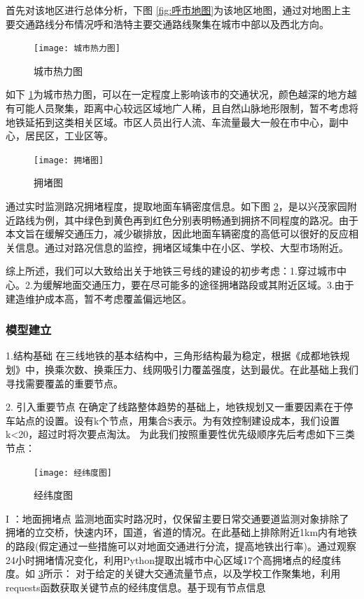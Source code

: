 \documentclass[12pt,a4paper]{mcmthesis}
\begin{document}
    首先对该地区进行总体分析，下图 \ref{fig:呼市地图}为该地区地图，通过对地图上主要交通路线分布情况呼和浩特主要交通路线聚集在城市中部以及西北方向。

    \begin{figure}[h!t]
        \centerline{\texttt{[image: 城市热力图]}\quad
        }
        \caption{\song\wuhao
        城市热力图}
        \label{fig:城市热力图}
    \end{figure}
    如下 \ref{fig:城市热力图}为城市热力图，可以在一定程度上影响该市的交通状况，颜色越深的地方越有可能人员聚集，距离中心较远区域地广人稀，且自然山脉地形限制，暂不考虑将地铁延拓到这类相关区域。市区人员出行人流、车流量最大一般在市中心，副中心，居民区，工业区等。
    \begin{figure}[h!t]
        \centerline{\texttt{[image: 拥堵图]}\quad
        }
        \caption{\song\wuhao
        拥堵图}
        \label{fig:拥堵图}
    \end{figure}


    通过实时监测路况拥堵程度，提取地面车辆密度信息。如下图 \ref{fig:拥堵图}，是以兴茂家园附近路线为例，其中绿色到黄色再到红色分别表明畅通到拥挤不同程度的路况。由于本文旨在缓解交通压力，减少碳排放，因此地面车辆密度的高低可以很好的反应相关信息。通过对路况信息的监控，拥堵区域集中在小区、学校、大型市场附近。

    综上所述，我们可以大致给出关于地铁三号线的建设的初步考虑：1.穿过城市中心。2.为缓解地面交通压力，要在尽可能多的途径拥堵路段或其附近区域。3.由于建造维护成本高，暂不考虑覆盖偏远地区。

    \subsubsection{模型建立}
    1.结构基础
    在三线地铁的基本结构中，三角形结构最为稳定，根据《成都地铁规划》中，换乘次数、换乘压力、线网吸引力覆盖强度，达到最优。在此基础上我们寻找需要覆盖的重要节点。

    2. 引入重要节点
    在确定了线路整体趋势的基础上，地铁规划又一重要因素在于停车站点的设置。设有k个节点，用集合S表示。为有效控制建设成本，我们设置k<20，超过时将次要点淘汰。
    为此我们按照重要性优先级顺序先后考虑如下三类节点：

    \begin{figure}[h!t]
        \centerline{\texttt{[image: 经纬度图]}\quad
        }
        \caption{\song\wuhao
        经纬度图}
        \label{fig:经纬度图}
    \end{figure}
    I ：地面拥堵点
    监测地面实时路况时，仅保留主要日常交通要道监测对象排除了拥堵的立交桥，快速内环，国道，省道的情况。在此基础上排除附近1km内有地铁的路段(假定通过一些措施可以对地面交通进行分流，提高地铁出行率)。通过观察24小时拥堵情况变化，利用Python提取出城市中心区域17个高拥堵点的经度纬度。如 \ref{fig:经纬度图}所示：
    对于给定的关键大交通流量节点，以及学校工作聚集地，利用requests函数获取关键节点的经纬度信息。基于现有节点信息
\end{document}
